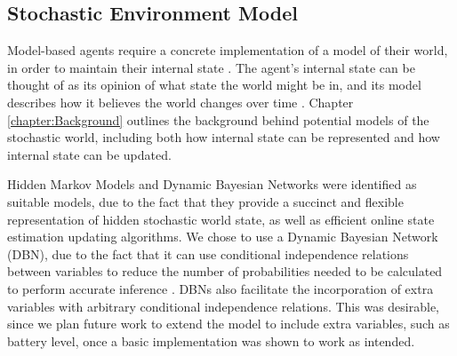 

\subsection{Stochastic Environment Model}\label{subsec:stochasticEnvModel}
Model-based agents require a concrete implementation of a model of their world, in order to maintain their internal state \cite[p.~50]{AIAMA}. The agent's internal state can be thought of as its opinion of what state the world might be in, and its model describes how it believes the world changes over time \cite{AIAMA}. Chapter \ref{chapter:Background} outlines the background behind potential models of the stochastic world, including both how internal state can be represented and how internal state can be updated.\par
Hidden Markov Models and Dynamic Bayesian Networks were identified as suitable models, due to the fact that they provide a succinct and flexible representation of hidden stochastic world state, as well as efficient online state estimation updating algorithms. We chose to use a Dynamic Bayesian Network (DBN), due to the fact that it can use conditional independence relations between variables to reduce the number of probabilities needed to be calculated to perform accurate inference \cite[p.~63]{KollerPGM}. DBNs also facilitate the incorporation of extra variables with arbitrary conditional independence relations. This was desirable, since we plan future work to extend the model to include extra variables, such as battery level, once a basic implementation was shown to work as intended.


